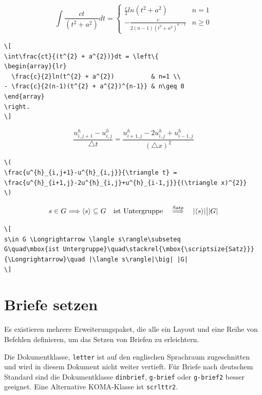 \documentclass[a4paper,10pt,twoside]{scrbook}
\begin{document}
\[
\int\frac{ct}{(t^{2} + a^{2})}dt = \left\{
\begin{array}{lr}
  \frac{c}{2}ln(t^{2} + a^{2})          & n=1 \\
- \frac{c}{2(n-1)(t^{2} + a^{2})^{n-1}} & n\geq 0
\end{array}
\right.
\]


\begin{lstlisting}[label=formelbeispiel8, style=customlatex]
\[
\int\frac{ct}{(t^{2} + a^{2})}dt = \left\{
\begin{array}{lr}
  \frac{c}{2}ln(t^{2} + a^{2})          & n=1 \\
- \frac{c}{2(n-1)(t^{2} + a^{2})^{n-1}} & n\geq 0
\end{array}
\right.
\]
\end{lstlisting}






\[
\frac{u^{h}_{i,j+1}-u^{h}_{i,j}}{\triangle t} = 
\frac{u^{h}_{i+1,j}-2u^{h}_{i,j}+u^{h}_{i-1,j}}{(\triangle x)^{2}}
\]

\begin{lstlisting}[label=formelbeispiel9, style=customlatex]
\(
\frac{u^{h}_{i,j+1}-u^{h}_{i,j}}{\triangle t} = 
\frac{u^{h}_{i+1,j}-2u^{h}_{i,j}+u^{h}_{i-1,j}}{(\triangle x)^{2}}
\)
\end{lstlisting}




\[
s\in G \Longrightarrow \langle s\rangle\subseteq 
G\quad\mbox{ist Untergruppe}\quad\stackrel{\mbox{\scriptsize{Satz}}}
{\Longrightarrow}\quad |\langle s\rangle|\big| |G|
\]


\begin{lstlisting}[label=formelbeispiel10, style=customlatex]
\[
s\in G \Longrightarrow \langle s\rangle\subseteq 
G\quad\mbox{ist Untergruppe}\quad\stackrel{\mbox{\scriptsize{Satz}}}
{\Longrightarrow}\quad |\langle s\rangle|\big| |G|
\]
\end{lstlisting}


\chapter{Briefe setzen}
\label{Kapitel_Briefe}

Es existieren mehrere Erweiterungspaket, die alle ein Layout und eine Reihe von Befehlen definieren, 
um das Setzen von Briefen zu erleichtern. 

Die Dokumentklasse, \verb!letter! ist auf den englischen Sprachraum zugeschnitten und wird in diesem Dokument nicht weiter vertieft. Für Briefe nach deutschem Standard sind die Dokumentklasse \verb!dinbrief!, \verb!g-brief! oder \verb!g-brief2! besser geeignet. 
Eine Alternative KOMA-Klasse ist \verb!scrlttr2!. 
\end{document}
